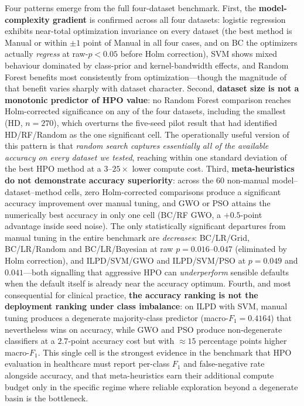 \documentclass[letterpaper, 10 pt, conference]{ieeeconf}
\begin{document}
Four patterns emerge from the full four-dataset benchmark. First, the \textbf{model-complexity gradient} is confirmed across all four datasets: logistic regression exhibits near-total optimization invariance on every dataset (the best method is Manual or within $\pm 1$ point of Manual in all four cases, and on BC the optimizers actually \emph{regress} at raw-$p < 0.05$ before Holm correction), SVM shows mixed behaviour dominated by class-prior and kernel-bandwidth effects, and Random Forest benefits most consistently from optimization---though the magnitude of that benefit varies sharply with dataset character. Second, \textbf{dataset size is not a monotonic predictor of HPO value}: no Random Forest comparison reaches Holm-corrected significance on any of the four datasets, including the smallest (HD, $n = 270$), which overturns the five-seed pilot result that had identified HD/RF/Random as the one significant cell. The operationally useful version of this pattern is that \emph{random search captures essentially all of the available accuracy on every dataset we tested}, reaching within one standard deviation of the best HPO method at a $3$--$25\times$ lower compute cost. Third, \textbf{meta-heuristics do not demonstrate accuracy superiority}: across the $60$ non-manual model--dataset--method cells, zero Holm-corrected comparisons produce a significant accuracy improvement over manual tuning, and GWO or PSO attains the numerically best accuracy in only one cell (BC/RF GWO, a $+0.5$-point advantage inside seed noise). The only statistically significant departures from manual tuning in the entire benchmark are \emph{decreases}: BC/LR/Grid, BC/LR/Random and BC/LR/Bayesian at raw $p = 0.016$--$0.047$ (eliminated by Holm correction), and ILPD/SVM/GWO and ILPD/SVM/PSO at $p = 0.049$ and $0.041$---both signalling that aggressive HPO can \emph{underperform} sensible defaults when the default itself is already near the accuracy optimum. Fourth, and most consequential for clinical practice, \textbf{the accuracy ranking is not the deployment ranking under class imbalance}: on ILPD with SVM, manual tuning produces a degenerate majority-class predictor (macro-$F_1 = 0.4164$) that nevertheless wins on accuracy, while GWO and PSO produce non-degenerate classifiers at a $2.7$-point accuracy cost but with $\approx 15$ percentage points higher macro-$F_1$. This single cell is the strongest evidence in the benchmark that HPO evaluation in healthcare must report per-class $F_1$ and false-negative rate alongside accuracy, and that meta-heuristics earn their additional compute budget only in the specific regime where reliable exploration beyond a degenerate basin is the bottleneck.
\end{document}
